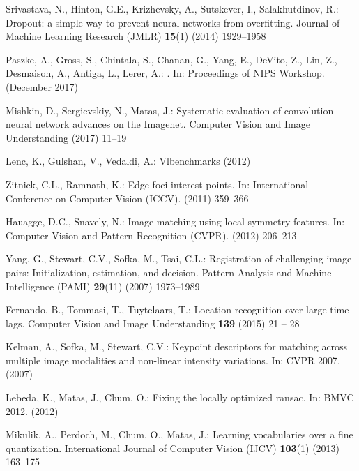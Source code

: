 \documentclass[runningheads]{llncs}
\begin{document}
{\begin{thebibliography}{10}
Srivastava, N., Hinton, G.E., Krizhevsky, A., Sutskever, I., Salakhutdinov, R.:
\newblock Dropout: a simple way to prevent neural networks from overfitting.
\newblock Journal of Machine Learning Research ({JMLR}) \textbf{15}(1) (2014)
  1929--1958


Paszke, A., Gross, S., Chintala, S., Chanan, G., Yang, E., DeVito, Z., Lin, Z., Desmaison, A., Antiga, L., Lerer, A.:
.
\newblock In: Proceedings of NIPS Workshop. (December 2017)

Mishkin, D., Sergievskiy, N., Matas, J.:
\newblock Systematic evaluation of convolution neural network advances on the Imagenet.
\newblock Computer Vision and Image Understanding (2017)  11--19


Lenc, K., Gulshan, V., Vedaldi, A.:
\newblock Vlbenchmarks (2012)

Zitnick, C.L., Ramnath, K.:
\newblock Edge foci interest points.
\newblock In: International Conference on Computer Vision ({ICCV}). (2011)
  359--366

Hauagge, D.C., Snavely, N.:
\newblock Image matching using local symmetry features.
\newblock In: Computer Vision and Pattern Recognition ({CVPR}). (2012)
  206--213

Yang, G., Stewart, C.V., Sofka, M., Tsai, C.L.:
\newblock Registration of challenging image pairs: Initialization, estimation,
  and decision.
\newblock Pattern Analysis and Machine Intelligence ({PAMI}) \textbf{29}(11)
  (2007)  1973--1989

Fernando, B., Tommasi, T., Tuytelaars, T.:
\newblock Location recognition over large time lags.
\newblock Computer Vision and Image Understanding \textbf{139} (2015)  21 -- 28

Kelman, A., Sofka, M., Stewart, C.V.:
\newblock Keypoint descriptors for matching across multiple image modalities
  and non-linear intensity variations.
\newblock In: {CVPR} 2007. (2007)

Lebeda, K., Matas, J., Chum, O.:
\newblock Fixing the locally optimized ransac.
\newblock In: {BMVC} 2012. (2012)

Mikulik, A., Perdoch, M., Chum, O., Matas, J.:
\newblock Learning vocabularies over a fine quantization.
\newblock International Journal of Computer Vision {(IJCV)} \textbf{103}(1)
  (2013)  163--175


\end{thebibliography}}
\end{document}
